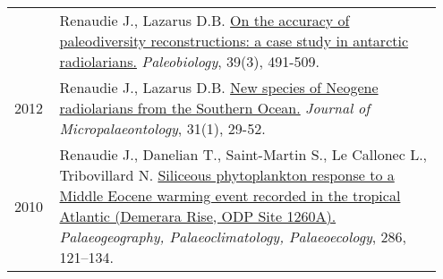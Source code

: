 \documentclass[11pt, a4paper]{article}
\begin{document}
\begin{longtable}{p{0.1\linewidth} P{0.85\linewidth}}
 & Renaudie J., Lazarus D.B. \href{http://dx.doi.org/10.1666/12016}{On the accuracy of paleodiversity reconstructions: a case study in antarctic radiolarians.} \textit{Paleobiology}, 39(3), 491-509.\\
2012 & Renaudie J., Lazarus D.B. \href{http://dx.doi.org/10.1144/0262-821X10-026}{New species of Neogene radiolarians from the Southern Ocean.} \textit{Journal of Micropalaeontology}, 31(1), 29-52.\\
2010 & Renaudie J., Danelian T., Saint-Martin S., Le Callonec L., Tribovillard N. \href{http://dx.doi.org/10.1016/j.palaeo.2009.12.004}{Siliceous phytoplankton response to a Middle Eocene warming event recorded in the tropical Atlantic (Demerara Rise, ODP Site 1260A).} \textit{Palaeogeography, Palaeoclimatology, Palaeoecology}, 286, 121--134.\\
\end{longtable}
%
%
\end{document}
